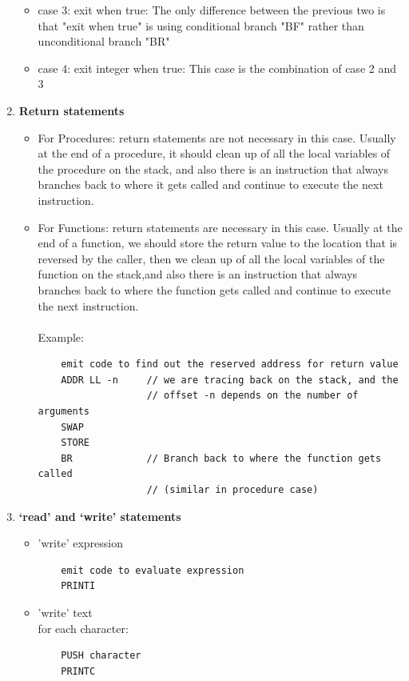 \documentclass[11pt]{article}
\begin{document}
\begin{enumerate}[label=(\alph*)]
\begin{itemize}
\item case 3: exit when true:
	The only difference between the previous two is that "exit when true" is using 
    conditional branch "BF" rather than unconditional branch "BR"
    
\item case 4: exit integer when true:
	This case is the combination of case 2 and 3
\end{itemize}

\item \textbf{Return statements}
\begin{itemize}
\item For Procedures:
return statements are not necessary in this case. Usually at the end of a procedure, it should clean up of all the local variables of the procedure on the stack, and also there is an instruction that always branches back to where it gets called and continue  to execute the next instruction.
\item For Functions: return statements are necessary in this case. Usually at the end of a function, we should store the return value to the location that is reversed by the caller, then we clean up of all the local variables of the function on the stack,and also there is an instruction that always branches back to where the function gets called and continue to execute the next instruction.\\
\\
Example:
\begin{lstlisting}
    emit code to find out the reserved address for return value
    ADDR LL -n     // we are tracing back on the stack, and the
                   // offset -n depends on the number of arguments
    SWAP
    STORE
    BR             // Branch back to where the function gets called
                   // (similar in procedure case)
\end{lstlisting}
\end{itemize}
\item \textbf{`read' and `write' statements}
\begin{itemize}
\item 'write' expression
\begin{lstlisting}
    emit code to evaluate expression
    PRINTI
\end{lstlisting}
\item 'write' text\\
for each character:
\begin{lstlisting}
    PUSH character
    PRINTC
\end{lstlisting}

\end{itemize}
\end{enumerate}
\end{document}

